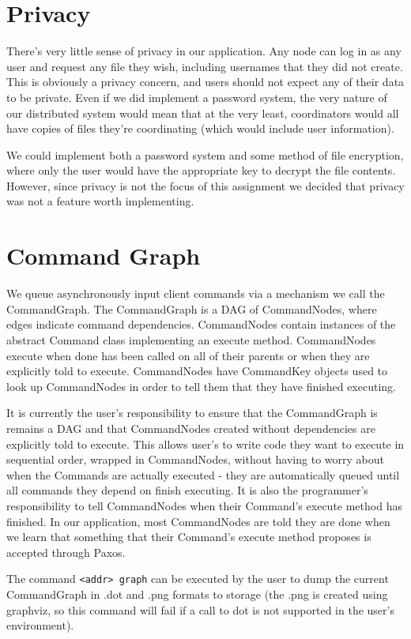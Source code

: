 \documentclass[11pt]{article}
\begin{document}
\section{Privacy}

There's very little sense of privacy in our application. Any node can log in as any user and request any file they wish, including usernames that they did not create. This is obviously a privacy concern, and users should not expect any of their data to be private. Even if we did implement a password system, the very nature of our distributed system would mean that at the very least, coordinators would all have copies of files they're coordinating (which would include user information). 

We could implement both a password system and some method of file encryption, where only the user would have the appropriate key to decrypt the file contents. However, since privacy is not the focus of this assignment we decided that privacy was not a feature worth implementing. 

\section{Command Graph}

We queue asynchronously input client commands via a mechanism we call the CommandGraph.
The CommandGraph is a DAG of CommandNodes, where edges indicate command dependencies.
CommandNodes contain instances of the abstract Command class implementing an execute method.
CommandNodes execute when done has been called on all of their parents or when they are explicitly told to execute.
CommandNodes have CommandKey objects used to look up CommandNodes in order to tell them that they have finished executing.

It is currently the user's responsibility to ensure that the CommandGraph is remains a DAG and that CommandNodes created without dependencies are
explicitly told to execute. This allows user's to write code they want to execute in sequential order, wrapped in CommandNodes, without having to
worry about when the Commands are actually executed - they are automatically queued until all commands they depend on finish executing.
It is also the programmer's responsibility to tell CommandNodes when their Command's execute method has finished. In our application,
most CommandNodes are told they are done when we learn that something that their Command's execute method proposes is accepted through Paxos.

The command \verb=<addr> graph= can be executed by the user to dump the current CommandGraph in .dot and .png formats to storage
(the .png is created using graphviz, so this command will fail if a call to dot is not supported in the user's environment).
\end{document}
